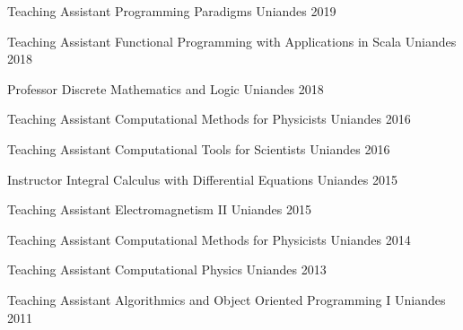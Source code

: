 


\begin{cvhonors}

    \cvhonor
    {Teaching Assistant}
    {Programming Paradigms}
    {Uniandes}
    {2019}

    \cvhonor
    {Teaching Assistant}
    {Functional Programming with Applications in Scala}
    {Uniandes}
    {2018}

    \cvhonor
    {Professor}
    {Discrete Mathematics and Logic}
    {Uniandes}
    {2018}

    \cvhonor
    {Teaching Assistant} %
    {Computational Methods for Physicists} %
    {Uniandes} %
    {2016} %

    \cvhonor
    {Teaching Assistant} %
    {Computational Tools for Scientists} %
    {Uniandes} %
    {2016} %

    \cvhonor
    {Instructor} %
    {Integral Calculus with Differential Equations} %
    {Uniandes} %
    {2015} %

    \cvhonor
    {Teaching Assistant} %
    {Electromagnetism II} %
    {Uniandes} %
    {2015} %

    \cvhonor
    {Teaching Assistant} %
    {Computational Methods for Physicists} %
    {Uniandes} %
    {2014} %

    \cvhonor
    {Teaching Assistant} %
    {Computational Physics} %
    {Uniandes} %
    {2013} %

    \cvhonor
    {Teaching Assistant} %
    {Algorithmics and Object Oriented Programming I} %
    {Uniandes} %
    {2011} %

\end{cvhonors}
